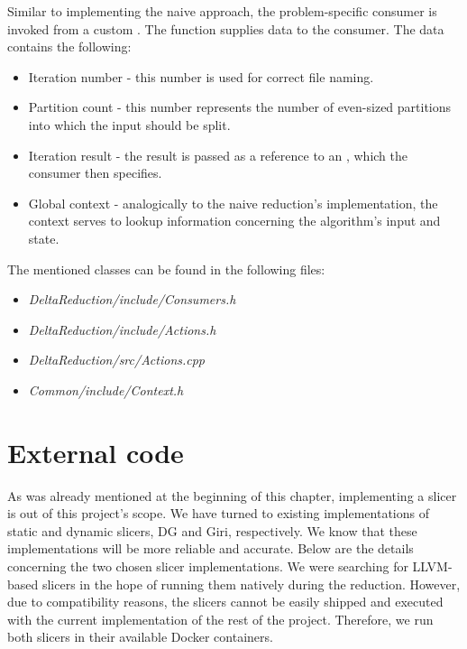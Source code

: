 Similar to implementing the naive approach, the problem-specific consumer is 
invoked from a custom . 
The  function supplies 
data to the consumer. 
The data contains the following:
\begin{itemize}
  \item Iteration number - this number is used for correct file naming.
  \item Partition count - this number represents the number of even-sized 
  partitions into which the input should be split.
  \item Iteration result - the result is passed as a reference to 
  an , which the consumer then specifies.
  \item Global context - analogically to the naive reduction's implementation, 
  the context serves to lookup information concerning the algorithm's input 
  and state.
\end{itemize}
The mentioned classes can be found in the following files: 
\begin{itemize}
  \item \emph{DeltaReduction/include/Consumers.h} 
  \item \emph{DeltaReduction/include/Actions.h} 
  \item \emph{DeltaReduction/src/Actions.cpp}
  \item \emph{Common/include/Context.h}
\end{itemize}

\section{External code}

As was already mentioned at the beginning of this chapter, implementing 
a slicer is out of this project's scope. 
We have turned to existing implementations of static and dynamic slicers, 
DG and Giri, respectively. 
We know that these implementations will be more reliable and accurate. 
Below are the details concerning the two chosen slicer implementations. 
We were searching for LLVM-based slicers in the hope of running them natively 
during the reduction. 
However, due to compatibility reasons, the slicers cannot be easily shipped 
and executed with the current implementation of the rest of the project. 
Therefore, we run both slicers in their available Docker containers.

